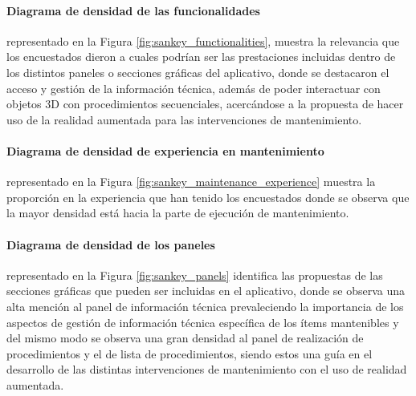             \paragraph{Diagrama de densidad de las funcionalidades}representado en la Figura \ref{fig:sankey_functionalities}, muestra la relevancia que los encuestados dieron a cuales podrían ser las prestaciones incluidas dentro de los distintos paneles o secciones gráficas del aplicativo, donde se destacaron el acceso y gestión de la información técnica, además de poder interactuar con objetos 3D con procedimientos secuenciales, acercándose a la propuesta de hacer uso de la realidad aumentada para las intervenciones de mantenimiento.

            

            \paragraph{Diagrama de densidad de experiencia en mantenimiento} representado en la Figura \ref{fig:sankey_maintenance_experience} muestra la proporción en la experiencia que han tenido los encuestados donde se observa que la mayor densidad está hacia la parte de ejecución de mantenimiento.

            

            \paragraph{Diagrama de densidad de los paneles} representado en la Figura \ref{fig:sankey_panels} identifica las propuestas de las secciones gráficas que pueden ser incluidas en el aplicativo, donde se observa una alta mención al panel de información técnica prevaleciendo la importancia de los aspectos de gestión de información técnica específica de los ítems mantenibles y del mismo modo se observa una gran densidad al panel de realización de procedimientos y el de lista de procedimientos, siendo estos una guía en el desarrollo de las distintas intervenciones de mantenimiento con el uso de realidad aumentada.

            
            
